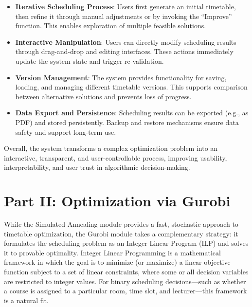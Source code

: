 \documentclass[11pt,a4paper]{article}
\begin{document}
\begin{itemize}
    \item \textbf{Iterative Scheduling Process}: Users first generate an initial timetable, then refine it through manual adjustments or by invoking the ``Improve'' function. This enables exploration of multiple feasible solutions.
    
    \item \textbf{Interactive Manipulation}: Users can directly modify scheduling results through drag-and-drop and editing interfaces. These actions immediately update the system state and trigger re-validation.
    
    \item \textbf{Version Management}: The system provides functionality for saving, loading, and managing different timetable versions. This supports comparison between alternative solutions and prevents loss of progress.
    
    \item \textbf{Data Export and Persistence}: Scheduling results can be exported (e.g., as PDF) and stored persistently. Backup and restore mechanisms ensure data safety and support long-term use.
\end{itemize}

Overall, the system transforms a complex optimization problem into an interactive, transparent, and user-controllable process, improving usability, interpretability, and user trust in algorithmic decision-making.


\section{Part II: Optimization via Gurobi}
While the Simulated Annealing module provides a fast, stochastic approach to timetable optimization, the Gurobi module takes a complementary strategy: it formulates the scheduling problem as an Integer Linear Program (ILP) and solves it to provable optimality. Integer Linear Programming is a mathematical framework in which the goal is to minimize (or maximize) a linear objective function subject to a set of linear constraints, where some or all decision variables are restricted to integer values. For binary scheduling decisions---such as whether a course is assigned to a particular room, time slot, and lecturer---this framework is a natural fit\cite{Talmor2024OptimizingAT}.
\end{document}
